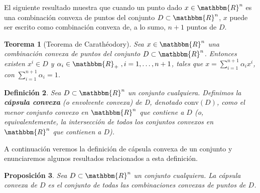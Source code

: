 \documentclass[a4paper,12pt]{report}
\newcommand{\RR}{\mathbbm{R}}
\newcommand{\Rn}{\RR^n}
\newtheorem{teo}{Teorema}[section]
\newtheorem{prop}[teo]{Proposici\'on}
\newtheorem{defi}[teo]{Definici\'on}
\begin{document}
El siguiente resultado muestra que cuando un punto dado $x\in\Rn$ es una combinaci\'on convexa de puntos del conjunto $D\subset\Rn$, $x$ puede ser escrito como combinaci\'on convexa de, a lo sumo, $n+1$ puntos de $D$.

\begin{teo}[Teorema de Carath\'eodory]\label{carat}
Sea $x\in\Rn$ una combinaci\'on convexa de puntos del conjunto $D\subset\Rn$. Entonces existen $x^i\in D$ y $\alpha_i\in\RR_+\; ,\linebreak i=1,\ldots,n+1$, tales que $x=\sum_{i=1}^{n+1}\alpha_i x^i$, con $\sum_{i=1}^{n+1}\alpha_i=1$.
\end{teo}


\begin{defi}
Sea $D\subset\Rn$ un conjunto cualquiera. Definimos la \textbf{c\'apsula convexa} (o envolvente convexa) de D, denotado $\mathrm{conv}(D)$, como el menor conjunto convexo en $\Rn$ que contiene a $D$ (o, equivalentemente, la intersecci\'on de todos los conjuntos convexos en $\Rn$ que contienen a $D$).
\end{defi}

A continuaci\'on veremos la definici\'on de c\'apsula convexa de un conjunto y enunciaremos algunos resultados relacionados a esta definici\'on.

\begin{prop}\label{comconv}
Sea $D\subset\Rn$ un conjunto cualquiera. La c\'apsula convexa de $D$ es el conjunto de todas las combinaciones convexas de puntos de $D$.
\end{prop}
\end{document}
